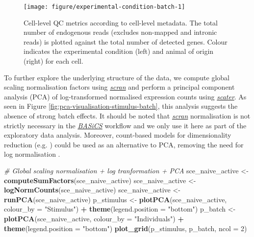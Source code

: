 \documentclass[9pt,a4paper,]{extarticle}
\newenvironment{Shaded}{\begin{snugshade}}{\end{snugshade}}
\newcommand{\CommentTok}[1]{\textcolor[rgb]{0.56,0.35,0.01}{\textit{#1}}}
\newcommand{\DataTypeTok}[1]{\textcolor[rgb]{0.13,0.29,0.53}{#1}}
\newcommand{\DecValTok}[1]{\textcolor[rgb]{0.00,0.00,0.81}{#1}}
\newcommand{\KeywordTok}[1]{\textcolor[rgb]{0.13,0.29,0.53}{\textbf{#1}}}
\newcommand{\NormalTok}[1]{#1}
\newcommand{\OperatorTok}[1]{\textcolor[rgb]{0.81,0.36,0.00}{\textbf{#1}}}
\newcommand{\StringTok}[1]{\textcolor[rgb]{0.31,0.60,0.02}{#1}}
\begin{document}
\begin{figure}

{\centering \texttt{[image: figure/experimental-condition-batch-1]} 

}

\caption{Cell-level QC metrics according to cell-level metadata. The total number of endogenous reads (excludes non-mapped and intronic reads) is plotted against the total number of detected genes. Colour indicates the experimental condition (left) and animal of origin (right) for each cell.}\label{fig:experimental-condition-batch}
\end{figure}

To further explore the underlying structure of the data, we compute global
scaling normalisation factors using \emph{\href{https://bioconductor.org/packages/3.11/scran}{scran}} and perform a
principal component analysis (PCA) of log-transformed normalised expression
counts using \emph{\href{https://bioconductor.org/packages/3.11/scater}{scater}}.
As seen in Figure \ref{fig:pca-visualisation-stimulus-batch}, this analysis
suggests the absence of strong batch effects.
It should be noted that \emph{\href{https://bioconductor.org/packages/3.11/scran}{scran}} normalisation
is not strictly necessary in the \emph{\href{https://bioconductor.org/packages/3.11/BASiCS}{BASiCS}} workflow and we only
use it here as part of the exploratory data analysis.
Moreover, count-based models for dimensionality reduction (e.g. \citep{Townes2019, Lopez2018}) could be used as an alternative to PCA,
removing the need for log normalisation .

\begin{Shaded}
\begin{Highlighting}[]
\CommentTok{# Global scaling normalisation + log tranformation + PCA}
\NormalTok{sce_naive_active <-}\StringTok{ }\KeywordTok{computeSumFactors}\NormalTok{(sce_naive_active)}
\NormalTok{sce_naive_active <-}\StringTok{ }\KeywordTok{logNormCounts}\NormalTok{(sce_naive_active)}
\NormalTok{sce_naive_active <-}\StringTok{ }\KeywordTok{runPCA}\NormalTok{(sce_naive_active)}
\NormalTok{p_stimulus <-}\StringTok{ }\KeywordTok{plotPCA}\NormalTok{(sce_naive_active, }\DataTypeTok{colour_by =} \StringTok{"Stimulus"}\NormalTok{) }\OperatorTok{+}
\StringTok{  }\KeywordTok{theme}\NormalTok{(}\DataTypeTok{legend.position =} \StringTok{"bottom"}\NormalTok{)}
\NormalTok{p_batch <-}\StringTok{ }\KeywordTok{plotPCA}\NormalTok{(sce_naive_active, }\DataTypeTok{colour_by =} \StringTok{"Individuals"}\NormalTok{) }\OperatorTok{+}
\StringTok{  }\KeywordTok{theme}\NormalTok{(}\DataTypeTok{legend.position =} \StringTok{"bottom"}\NormalTok{)}
\KeywordTok{plot_grid}\NormalTok{(p_stimulus, p_batch, }\DataTypeTok{ncol =} \DecValTok{2}\NormalTok{)}
\end{Highlighting}
\end{Shaded}
\end{document}
